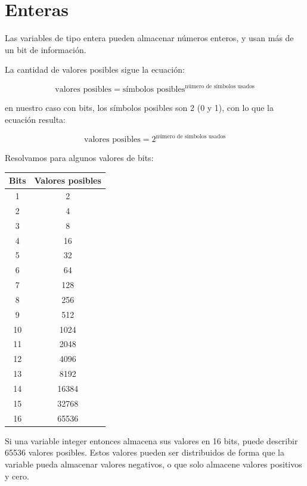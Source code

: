 \documentclass[../principal.tex]{subfiles}
\begin{document}
\section{Enteras}

Las variables de tipo entera pueden almacenar números enteros, y usan más de un bit de información.

La cantidad de valores posibles sigue la ecuación:

\begin{equation}
    \text{valores posibles} = \text{símbolos posibles}^{\text{número de símbolos usados}}
\end{equation}

en nuestro caso con bits, los símbolos posibles son 2 (0 y 1), con lo que la ecuación resulta:

\begin{equation}
    \text{valores posibles} = {2}^{\text{número de símbolos usados}}
\end{equation}

Resolvamos para algunos valores de bits:

\begin{table}[H]
\begin{tabular}{c|c}
    \textbf{Bits} & \textbf{Valores posibles} \\
    \hline
    1 & 2 \\
    2 & 4 \\
    3 & 8 \\
    4 & 16 \\
    5 & 32 \\
    6 & 64 \\
    7 & 128 \\
    8 & 256 \\
    9 & 512 \\
    10 & 1024 \\
    11 & 2048 \\
    12 & 4096 \\
    13 & 8192 \\
    14 & 16384 \\
    15 & 32768 \\
    16 & 65536 \\
\end{tabular}
\end{table}

Si una variable integer entonces almacena sus valores en 16 bits, puede describir 65536 valores posibles. Estos valores pueden ser distribuidos de forma que la variable pueda almacenar valores negativos, o que solo almacene valores positivos y cero.
\end{document}
